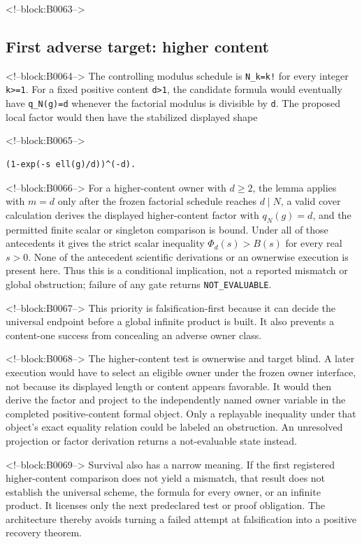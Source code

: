 \documentclass[11pt]{article}
\begin{document}
<!--block:B0063-->
\hypertarget{42-first-adverse-target-higher-content}{%
\subsection{First adverse target: higher
content}\label{42-first-adverse-target-higher-content}}

<!--block:B0064-->
The controlling modulus schedule is \texttt{N\_k=k!} for every integer
\texttt{k\textgreater{}=1}. For a fixed positive content
\texttt{d\textgreater{}1}, the candidate formula would eventually have
\texttt{q\_N(g)=d} whenever the factorial modulus is divisible by
\texttt{d}. The proposed local factor would then have the stabilized
displayed shape

<!--block:B0065-->
\begin{verbatim}
(1-exp(-s ell(g)/d))^(-d).
\end{verbatim}

<!--block:B0066-->
For a higher-content owner with \(d\geq2\), the lemma applies with
\(m=d\) only after the frozen factorial schedule reaches \(d\mid N\), a valid
cover calculation derives the displayed higher-content factor with
\(q_N(g)=d\), and the permitted finite scalar or singleton comparison is bound.
Under all of those antecedents it gives the strict scalar inequality
\(\Phi_d(s)>B(s)\) for every real \(s>0\).  None of the antecedent scientific
derivations or an ownerwise execution is present here.  Thus this is a conditional
implication, not a reported mismatch or global obstruction; failure of any gate
returns \texttt{NOT\_EVALUABLE}.

<!--block:B0067-->
This priority is falsification-first because it can decide the universal
endpoint before a global infinite product is built. It also prevents a
content-one success from concealing an adverse owner class.

<!--block:B0068-->
The higher-content test is ownerwise and target blind. A later execution
would have to select an eligible owner under the frozen owner interface,
not because its displayed length or content appears favorable. It would
then derive the factor and project to the independently named owner
variable in the completed positive-content formal object. Only a
replayable inequality under that object's exact equality relation could
be labeled an obstruction. An unresolved projection or factor
derivation returns a not-evaluable state instead.

<!--block:B0069-->
Survival also has a narrow meaning. If the first registered
higher-content comparison does not yield a mismatch, that result does
not establish the universal scheme, the formula for every owner, or an
infinite product. It licenses only the next predeclared test or proof
obligation. The architecture thereby avoids turning a failed attempt at
falsification into a positive recovery theorem.
\end{document}

